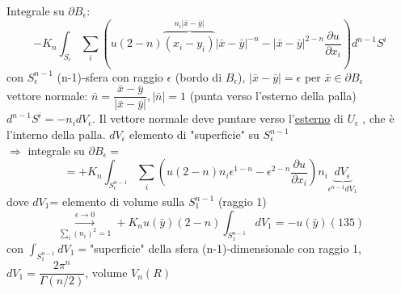 \documentclass[a4paper,11pt]{report}
\newcommand{\x}{\bar{x}}
\newcommand{\y}{\bar{y}}
\begin{document}
Integrale su $\partial B_\epsilon$:
$$
-K_n\int_{S_\epsilon}\sum_i\left(u(2-n)\overset{n_i |\x - \y|}{\overbrace{(x_i-y_i)}}|\x - \y|^{-n}-|\x-\y|^{2-n}\dfrac{\partial u}{\partial x_i}\right) d^{n-1}S^i
$$
con $S_\epsilon^{n-1}$ (n-1)-sfera con raggio $\epsilon$ (bordo di $B_\epsilon$), $|\x-\y|=\epsilon$ per $\x \in \partial B_\epsilon$\\
vettore normale: $\bar{n}=\dfrac{\x - \y}{|\x-\y|}, |\bar{n}|=1$ (punta verso l'esterno della palla)\\
$d^{n-1}S^i= - n_idV_\epsilon$. Il vettore normale deve puntare verso l'\underline{esterno} di $U_\epsilon$ , che è l'interno della palla. $dV_\epsilon$ elemento di "superficie" su $S^{n-1}_\epsilon$\\
$ \Rightarrow $ integrale su $\partial B_\epsilon=$
$$
=+K_n\int_{S_\epsilon^{n-1}} \sum_i \left(u(2-n)n_i\epsilon^{1-n}-\epsilon^{2-n}\dfrac{\partial u}{\partial x_i}\right)n_i\underset{\epsilon^{n-1}dV_1}{\underbrace{dV_\epsilon}}
$$
dove $dV_1$= elemento di volume sulla $S_1^{n-1}$ (raggio 1)
\begin{equation}
\overset{\epsilon \to 0}{\underset{\sum_i (n_i)^2=1}{\longrightarrow}}+K_n u(\y)(2-n)\int_{S_1^{n-1}}dV_1=-u(\y) (135)
\end{equation}
con $\int_{S_1^{n-1}}dV_1=$"superficie" della sfera (n-1)-dimensionale con raggio 1,  $dV_1=\dfrac{2\pi^{n}}{\Gamma(n/2)}$, volume $V_n(R)$
\end{document}
